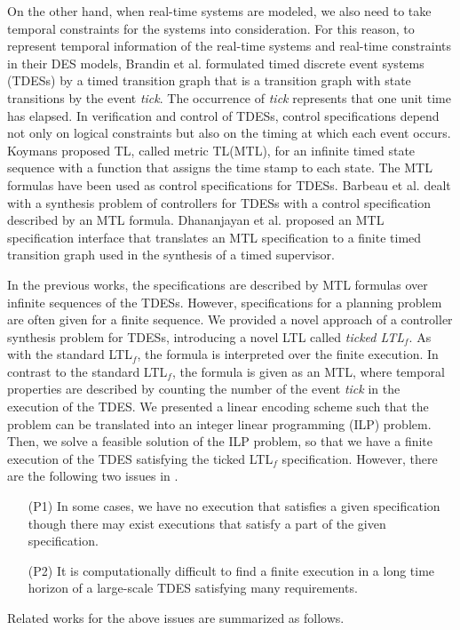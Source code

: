 \documentclass[journal,twoside,web]{IEEEtran}
\begin{document}
On the other hand, when real-time systems are modeled, we also need to take temporal constraints for the systems into consideration.
For this reason, to represent temporal information of the real-time systems and real-time constraints in their DES models, Brandin et al.\cite{BW1994} formulated timed discrete event systems (TDESs) by a timed transition graph that is a transition graph with state transitions by the event \textit{tick}.
The occurrence of \textit{tick} represents that one unit time has elapsed.
In verification and control of TDESs, control specifications depend not only on logical constraints but also on the timing at which each event occurs. 
Koymans\cite{K1990} proposed TL, called metric TL(MTL),  for an infinite timed state sequence with a function that assigns the time stamp to each state.
The MTL formulas have been used as control specifications for TDESs.
Barbeau et al.\cite{BKD1998} dealt with a synthesis problem of controllers for TDESs with a control specification described by an MTL formula. 
Dhananjayan et al.\cite{DS2014} proposed an MTL specification interface that translates an MTL specification to a finite timed transition graph used in the synthesis of a timed supervisor.

%
In the previous works, the specifications are described by MTL formulas over infinite sequences of the TDESs. 
However, specifications for a planning problem are often given for a finite sequence\cite{camacho2019strong}. 
%
We provided a novel approach of a controller synthesis problem for TDESs, introducing a novel LTL called \textit{ticked LTL}$_f$\cite{KHU2020}.
As with the standard LTL$_f$\cite{Zhu2017}, the formula is interpreted over the finite execution.
In contrast to the standard LTL$_f$, the formula is given as an MTL, where temporal properties are described by counting the number of the event \textit{tick} in the execution of the TDES.
We presented a linear encoding scheme such that the problem can be translated into an integer linear programming (ILP) problem. 
Then, we solve a feasible solution of the ILP problem, so that we have a finite execution of the TDES satisfying the ticked LTL$_f$ specification.
However, there are the following two issues in \cite{KHU2020}.
\begin{itemize}
\setlength{\itemindent}{0.5cm}
\item[(P1)]
In some cases, we have no execution that satisfies a given specification though there may exist executions that satisfy a part of the given specification.
%
\item[(P2)]
It is computationally difficult to find a finite execution in a long time horizon of a large-scale TDES satisfying many requirements. 
\end{itemize}
%
%
Related works for the above issues are summarized as follows.
\end{document}

